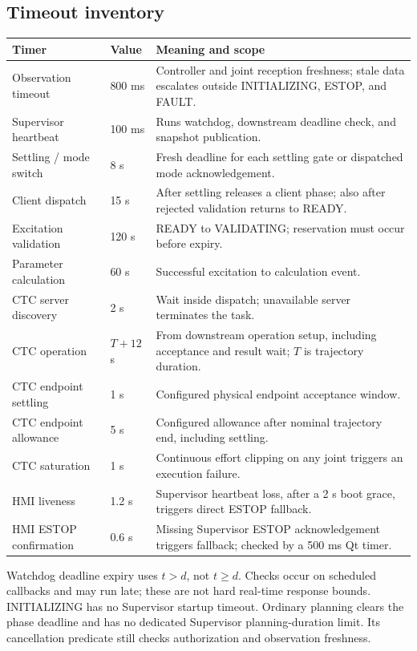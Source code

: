 \documentclass[11pt,a4paper]{report}
\begin{document}
\subsection{Timeout inventory}
\begin{longtable}{L{.33\linewidth}L{.16\linewidth}L{.44\linewidth}}
\toprule Timer & Value & Meaning and scope \\\midrule\endhead
Observation timeout & 800 ms & Controller and joint reception freshness; stale data escalates outside INITIALIZING, ESTOP, and FAULT. \\
Supervisor heartbeat & 100 ms & Runs watchdog, downstream deadline check, and snapshot publication. \\
Settling / mode switch & 8 s & Fresh deadline for each settling gate or dispatched mode acknowledgement. \\
Client dispatch & 15 s & After settling releases a client phase; also after rejected validation returns to READY. \\
Excitation validation & 120 s & READY to VALIDATING; reservation must occur before expiry. \\
Parameter calculation & 60 s & Successful excitation to calculation event. \\
CTC server discovery & 2 s & Wait inside dispatch; unavailable server terminates the task. \\
CTC operation & $T+12$ s & From downstream operation setup, including acceptance and result wait; $T$ is trajectory duration. \\
CTC endpoint settling & 1 s & Configured physical endpoint acceptance window. \\
CTC endpoint allowance & 5 s & Configured allowance after nominal trajectory end, including settling. \\
CTC saturation & 1 s & Continuous effort clipping on any joint triggers an execution failure. \\
HMI liveness & 1.2 s & Supervisor heartbeat loss, after a 2 s boot grace, triggers direct ESTOP fallback. \\
HMI ESTOP confirmation & 0.6 s & Missing Supervisor ESTOP acknowledgement triggers fallback; checked by a 500 ms Qt timer. \\
\bottomrule
\end{longtable}
Watchdog deadline expiry uses $t>d$, not $t\ge d$. Checks occur on scheduled callbacks and may run late; these are not hard real-time response bounds. INITIALIZING has no Supervisor startup timeout. Ordinary planning clears the phase deadline and has no dedicated Supervisor planning-duration limit. Its cancellation predicate still checks authorization and observation freshness.
\end{document}
